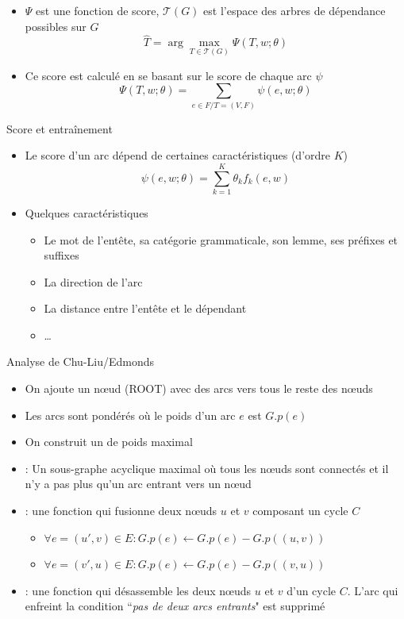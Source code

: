 \documentclass{KodeBook}
\begin{document}
\begin{itemize}
	\item $\Psi$ est une fonction de score, $ \mathcal{T}(G) $ est l'espace des arbres de dépendance possibles sur $G$
	\[ \hat{T} = \arg\max\limits_{T \in \mathcal{T}(G)} \Psi(T, w; \theta) \]
	\item Ce score est calculé en se basant sur le score de chaque arc $\psi$
	\[ \Psi(T, w; \theta) = \sum_{e \in F / T = (V, F)} \psi(e, w; \theta) \]
\end{itemize}

Score et entraînement
\begin{itemize}
	\item Le score d'un arc dépend de certaines caractéristiques (d'ordre $K$)
	\[ \psi(e, w; \theta) = \sum_{k = 1}^{K} \theta_k f_k(e, w)  \]
	
	\item Quelques caractéristiques 
	\begin{itemize}
		\item Le mot de l'entête, sa catégorie grammaticale, son lemme, ses préfixes et suffixes
		\item La direction de l'arc
		\item La distance entre l'entête et le dépendant
		\item \ldots
	\end{itemize}
	
\end{itemize}

Analyse de Chu-Liu/Edmonds
\begin{itemize}
	\item On ajoute un nœud (ROOT) avec des arcs vers tous le reste des nœuds 
	\item Les arcs sont pondérés où le poids d'un arc $e$ est $G.p(e)$
	\item On construit un  de poids maximal
	\item {} : Un sous-graphe acyclique maximal où tous les nœuds sont connectés et il n'y a pas plus qu'un arc entrant vers un nœud
	\item {} : une fonction qui fusionne deux nœuds $u$ et $v$ composant un cycle $C$
	\begin{itemize}
		\item $\forall e = (u', v) \in E : G.p(e) \leftarrow G.p(e) - G.p((u, v)) $
		\item $\forall e = (v', u) \in E : G.p(e) \leftarrow G.p(e) - G.p((v, u)) $
	\end{itemize}
	\item {} : une fonction qui désassemble les deux nœuds $u$ et $v$ d'un cycle $C$. L'arc qui enfreint la condition ``\textit{pas de deux arcs entrants}" est supprimé
\end{itemize}
\end{document}

